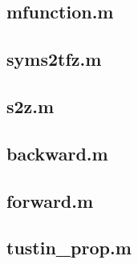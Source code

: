     \subsection*{mfunction.m}
    \label{subsec:mfunctionex7}
    
    
    \subsection*{syms2tfz.m}
    \label{subsec:syms2tfz}
    
    
    \subsection*{s2z.m}
    \label{subsec:s2z}
    
    
    \subsection*{backward.m}
    \label{subsec:backward}
    
    
    \subsection*{forward.m}
    \label{subsec:forward}
    
    
    \subsection*{tustin\_prop.m}
    \label{subsec:tustin}
    